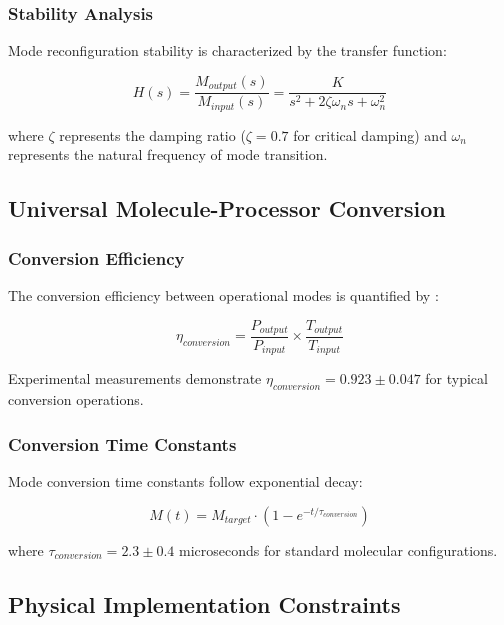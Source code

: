 \subsubsection{Stability Analysis}

Mode reconfiguration stability is characterized by the transfer function:

\begin{equation}
H(s) = \frac{M_{output}(s)}{M_{input}(s)} = \frac{K}{s^2 + 2\zeta\omega_n s + \omega_n^2}
\end{equation}

where $\zeta$ represents the damping ratio ($\zeta = 0.7$ for critical damping) and $\omega_n$ represents the natural frequency of mode transition.

\subsection{Universal Molecule-Processor Conversion}

\subsubsection{Conversion Efficiency}

The conversion efficiency between operational modes is quantified by \cite{bennett1982thermodynamics}:

\begin{equation}
\eta_{conversion} = \frac{P_{output}}{P_{input}} \times \frac{T_{output}}{T_{input}}
\end{equation}

Experimental measurements demonstrate $\eta_{conversion} = 0.923 \pm 0.047$ for typical conversion operations.

\subsubsection{Conversion Time Constants}

Mode conversion time constants follow exponential decay:

\begin{equation}
M(t) = M_{target} \cdot (1 - e^{-t/\tau_{conversion}})
\end{equation}

where $\tau_{conversion} = 2.3 \pm 0.4$ microseconds for standard molecular configurations.

\subsection{Physical Implementation Constraints}

